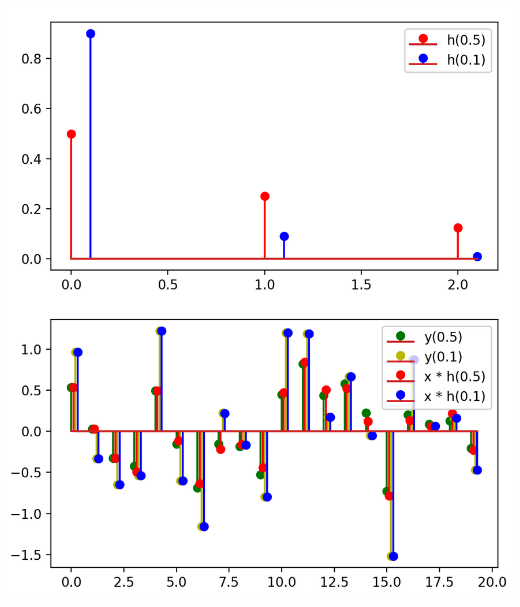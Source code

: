\begin{listing}
    \noindent
    \begin{minipage}{0.49\textwidth}
        \strut\vspace*{-\baselineskip}\newline
        \inputminted[firstline=5,lastline=33]{python3}{code/exp_mean.py}
    \end{minipage}%
    \begin{minipage}{0.49\textwidth}
        \strut\vspace*{-\baselineskip}\newline
        \includegraphics[width=\textwidth]{code/exp_mean.png}
    \end{minipage}
    \label{py:exp_mean}
\end{listing}
